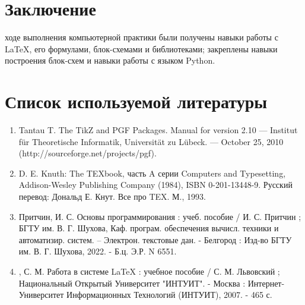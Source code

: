 \chapter{Заключение}

 ходе выполнения компьютерной практики были получены навыки работы с LaTeX, его формулами, блок-схемами и библиотеками; закреплены навыки построения блок-схем и навыки работы с языком Python.

\chapter{Список используемой литературы}

\begin{enumerate}
	\item\large Tantau T. The TikZ and PGF Packages. Manual for version 2.10 — Institut für Theoretische Informatik, Universität zu Lübeck. — October 25, 2010 (http://sourceforge.net/projects/pgf).
	\item\large D. E. Knuth: The TEXbook, часть A серии Computers and Typesetting, Addison-Wesley Publishing Company (1984), ISBN 0-201-13448-9. Русский перевод: Дональд Е. Кнут. Все про TEX. М., 1993.
	\item\large Притчин, И. С. Основы программирования : учеб. пособие / И. С. Притчин ; БГТУ им. В. Г. Шухова, Каф. програм. обеспечения вычисл. техники и автоматизир. систем. -- Электрон. текстовые дан. - Белгород : Изд-во БГТУ им. В. Г. Шухова, 2022. - Б.ц. Э.Р. N 6551.
	\item{}, С. М. Работа в системе LaTeX : учебное пособие / С. М. Львовский ; Национальный Открытый Университет "ИНТУИТ". - Москва : Интернет-Университет Информационных Технологий (ИНТУИТ), 2007. - 465 с.
\end{enumerate}
